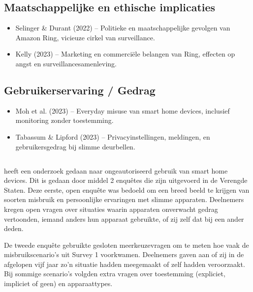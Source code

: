 \documentclass[nonacm,sigconf]{acmart}
\begin{document}
\begin{editorsonlyBox}
        \subsection{Maatschappelijke en ethische implicaties}
        \begin{itemize}
            \item Selinger & Durant (2022) – Politieke en maatschappelijke gevolgen van Amazon Ring, vicieuze cirkel van surveillance.
            \item Kelly (2023) – Marketing en commerciële belangen van Ring, effecten op angst en surveillancesamenleving.
        \end{itemize}

        \subsection{Gebruikerservaring / Gedrag}
        \begin{itemize}
            \item Moh et al. (2023) – Everyday misuse van smart home devices, inclusief monitoring zonder toestemming.
            \item Tabassum & Lipford (2023) – Privacyinstellingen, meldingen, en gebruikersgedrag bij slimme deurbellen.
        \end{itemize}

    \end{editorsonlyBox}



    \subsection{}

    \parencite{moh2023characterizing} heeft een onderzoek gedaan naar ongeautoriseerd gebruik van smart home devices.
    Dit is gedaan door middel 2 enquêtes die zijn uitgevoerd in de Verengde Staten.
    Deze eerste, open enquête was bedoeld om een breed beeld te krijgen van soorten misbruik en persoonlijke ervaringen met slimme apparaten.
    Deelnemers kregen open vragen over situaties waarin apparaten onverwacht gedrag vertoonden, iemand anders hun apparaat gebruikte, of zij zelf dat bij een ander deden.

    De tweede enquête gebruikte gesloten meerkeuzevragen om te meten hoe vaak de misbruikscenario’s uit Survey 1 voorkwamen.
    Deelnemers gaven aan of zij in de afgelopen vijf jaar zo’n situatie hadden meegemaakt of zelf hadden veroorzaakt.
    Bij sommige scenario’s volgden extra vragen over toestemming (expliciet, impliciet of geen) en apparaattypes.
\end{document}
